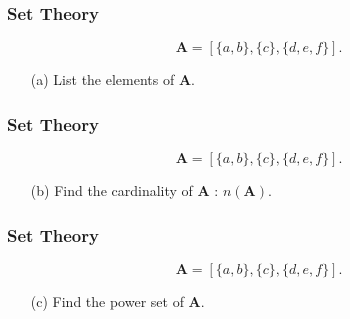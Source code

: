 \documentclass{beamer}
\begin{document}
\begin{frame}
\frametitle{Set Theory}
\Large
\vspace{-3.8cm}
\[\boldsymbol{A} = [\{a, b\}, \{c\},\{d, e, f \}]. \]
\begin{itemize}
\item[(a)] List the elements of \textbf{A}. 
\end{itemize}

\end{frame}

\begin{frame}
\frametitle{Set Theory}
\Large
\vspace{-3.8cm}
\[\boldsymbol{A} = [\{a, b\}, \{c\},\{d, e, f \}]. \]
\begin{itemize}
\item[(b)] Find the cardinality of \textbf{A} : $n(\boldsymbol{A})$. 
\end{itemize}

\end{frame}

\begin{frame}
\frametitle{Set Theory}
\Large
\vspace{-3.8cm}
\[\boldsymbol{A} = [\{a, b\}, \{c\},\{d, e, f \}]. \]
\begin{itemize}
\item[(c)] Find the power set of \textbf{A}. 
\end{itemize}

\end{frame}

\end{document}
